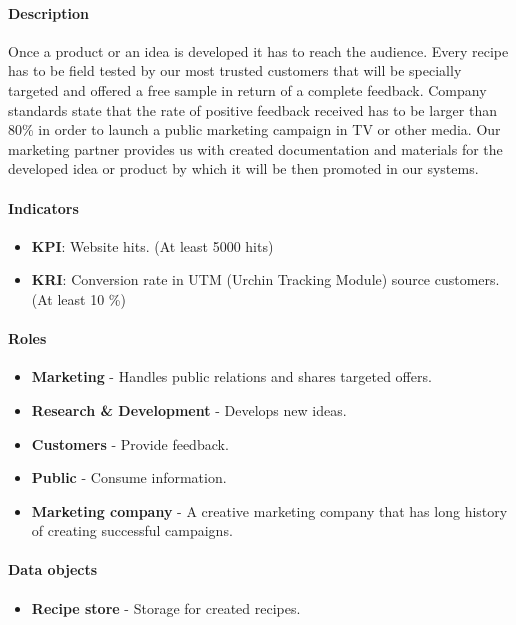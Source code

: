\documentclass[11pt,a4paper]{article}
\begin{document}
\paragraph{Description}
Once a product or an idea is developed it has to reach the audience. Every recipe has to be field tested by our most trusted customers that will be specially targeted and offered a free sample in return of a complete feedback. Company standards state that the rate of positive feedback received has to be larger than 80\% in order to launch a public marketing campaign in TV or other media. Our marketing partner provides us with created documentation and materials for the developed idea or product by which it will be then promoted in our systems.

\paragraph{Indicators}

\begin{itemize}
    \item \textbf{KPI}: Website hits. (At least 5000 hits)
    \item \textbf{KRI}: Conversion rate in UTM (Urchin Tracking Module) source customers. (At least 10 \%)
\end{itemize}

\paragraph{Roles}

\begin{itemize}
    \item \textbf{Marketing} - Handles public relations and shares targeted offers.
    \item \textbf{Research \& Development} - Develops new ideas.
    \item \textbf{Customers} - Provide feedback.
    \item \textbf{Public} - Consume information.
    \item \textbf{Marketing company} - A creative marketing company that has long history of creating successful campaigns.
\end{itemize}

\paragraph{Data objects}

\begin{itemize}
    \item \textbf{Recipe store} - Storage for created recipes.
\end{itemize}
\end{document}
